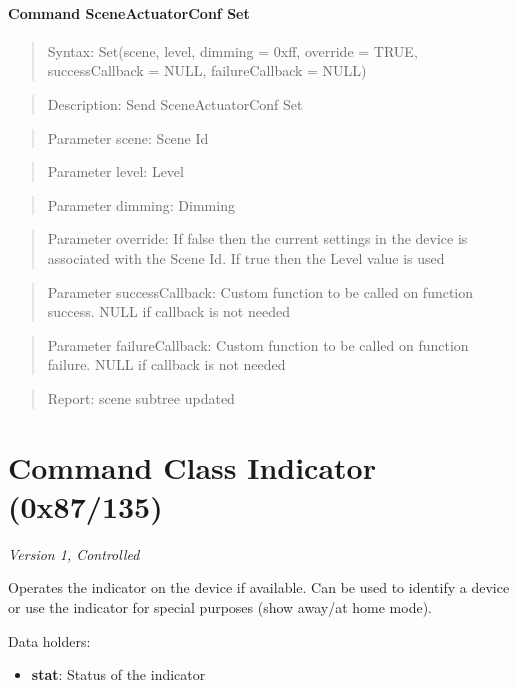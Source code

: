 \paragraph{Command SceneActuatorConf Set}
\begin{quote}Syntax: Set(scene, level, dimming = 0xff, override = TRUE, successCallback = NULL, failureCallback = NULL)\end{quote}
\begin{quote}Description: Send SceneActuatorConf Set\end{quote}
\begin{quote}Parameter scene: Scene Id\end{quote}
\begin{quote}Parameter level: Level\end{quote}
\begin{quote}Parameter dimming: Dimming\end{quote}
\begin{quote}Parameter override: If false then the current settings in the device is associated with the Scene Id. If true then the Level value is used\end{quote}
\begin{quote}Parameter successCallback: Custom function to be called on function success. NULL if callback is not needed\end{quote}
\begin{quote}Parameter failureCallback: Custom function to be called on function failure. NULL if callback is not needed\end{quote}
\begin{quote}Report: scene subtree updated\end{quote}


\section{Command Class Indicator (0x87/135)}

\textit{Version 1, Controlled}
\newline

Operates the indicator on the device if available. Can be used to identify a device or use the indicator for special purposes (show away/at home mode).
\newline

\noindent
Data holders:

\begin{itemize}
\item \textbf{stat}: Status of the indicator
\end{itemize}

